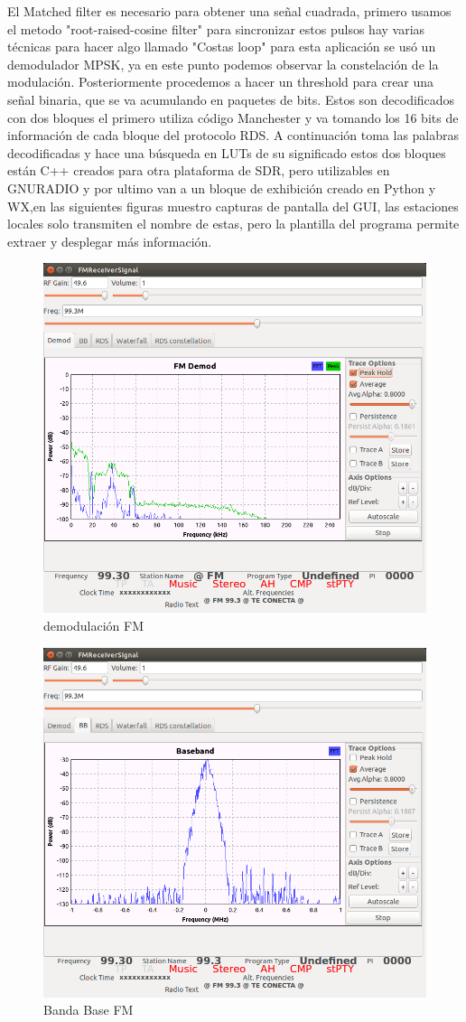 \documentclass[preprint,12pt]{elsarticle}
\begin{document}
El Matched filter es necesario para obtener una señal cuadrada, primero usamos el metodo "root-raised-cosine filter" para sincronizar estos pulsos hay varias técnicas para hacer algo llamado "Costas loop" para esta aplicación se usó un demodulador MPSK, ya en este punto podemos observar la constelación de la modulación. Posteriormente procedemos a hacer un threshold para crear una señal binaria, que se va acumulando en paquetes de bits. Estos son decodificados con dos bloques el primero utiliza código Manchester y va tomando los 16 bits de información de cada bloque del protocolo RDS. A continuación toma las palabras decodificadas y hace una búsqueda en LUTs de su significado estos dos bloques están C++ creados para otra plataforma de SDR, pero utilizables en GNURADIO y por ultimo van a un bloque de exhibición creado en Python y WX,en las siguientes figuras muestro capturas de pantalla del GUI, las estaciones locales solo transmiten el nombre de estas, pero la plantilla del programa permite extraer y desplegar más información.
  \begin{figure}[htbp!]
\centering\includegraphics[width=0.7\linewidth]{ffdemod.png}
\caption{demodulación FM}
\label{demodFM}
\end{figure}

  \begin{figure}[htbp!]
\centering\includegraphics[width=0.6\linewidth]{bbfm.png}
\caption{Banda Base FM}
\label{bbFM}
\end{figure}
\end{document}
